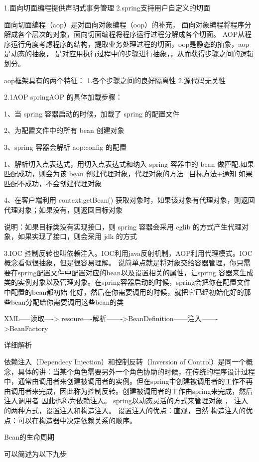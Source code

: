 \documentclass[UTF8]{ctexart}
\begin{document}
1.面向切面编程提供声明式事务管理
2.spring支持用户自定义的切面

面向切面编程（aop）是对面向对象编程（oop）的补充， 面向对象编程将程序分解成各个层次的对象，面向切面编程将程序运行过程分解成各个切面。 AOP从程序运行角度考虑程序的结构，提取业务处理过程的切面，oop是静态的抽象，aop是动态的抽象， 是对应用执行过程中的步骤进行抽象，，从而获得步骤之间的逻辑划分。

aop框架具有的两个特征：
1.各个步骤之间的良好隔离性
2.源代码无关性

2.1AOP
springAOP 的具体加载步骤：

1、当 spring 容器启动的时候，加载了 spring 的配置文件

2、为配置文件中的所有 bean 创建对象

3、spring 容器会解析 aop:config 的配置

 1、解析切入点表达式，用切入点表达式和纳入 spring 容器中的 bean 做匹配.如果匹配成功，则会为该 bean 创建代理对象，代理对象的方法=目标方法+通知 如果匹配不成功，不会创建代理对象

4、在客户端利用 context.getBean() 获取对象时，如果该对象有代理对象，则返回代理对象；如果没有，则返回目标对象

说明：如果目标类没有实现接口，则 spring 容器会采用 cglib 的方式产生代理对象，如果实现了接口，则会采用 jdk 的方式

3.IOC
控制反转也叫依赖注入。IOC利用java反射机制，AOP利用代理模式。IOC 概念看似很抽象，但是很容易理解。 说简单点就是将对象交给容器管理，你只需要在spring配置文件中配置对应的bean以及设置相关的属性，让spring 容器来生成类的实例对象以及管理对象。在spring容器启动的时候，spring会把你在配置文件中配置的bean都初始 化好，然后在你需要调用的时候，就把它已经初始化好的那些bean分配给你需要调用这些bean的类

XML–—读取––-> resoure----解析------->BeanDefinition––—注入––––->BeanFactory

详细解析

依赖注入（Dependecy Injection）和控制反转（Inversion of Control）是同一个概念，具体的讲：当某个角色需要另外一个角色协助的时候，在传统的程序设计过程中，通常由调用者来创建被调用者的实例。但在spring中创建被调用者的工作不再由调用者来完成，因此称为控制反转。创建被调用者的工作由spring来完成，然后注入调用者
因此也称为依赖注入。
spring以动态灵活的方式来管理对象 ， 注入的两种方式，设置注入和构造注入。
设置注入的优点：直观，自然
构造注入的优点：可以在构造器中决定依赖关系的顺序。

Bean的生命周期

可以简述为以下九步
\end{document}
